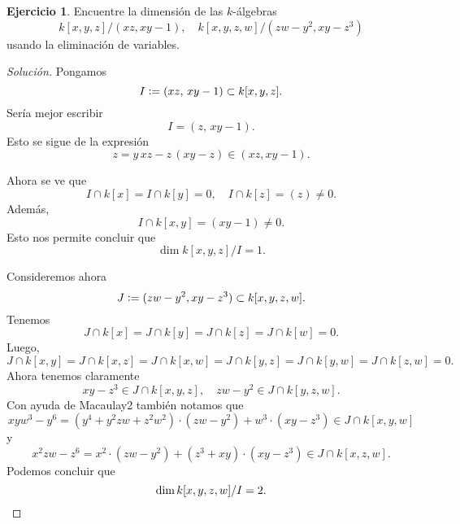\documentclass{article}
\theoremstyle{definition}
\newtheorem{ejerc}{Ejercicio}
\newenvironment{solucion}{\begin{proof}[Solución]}{\end{proof}}
\begin{document}
\begin{ejerc}
  Encuentre la dimensión de las $k$-álgebras
  $$k[x,y,z]/(xz, xy - 1), \quad k[x,y,z,w]/(zw - y^2 , xy - z^3)$$
  usando la eliminación de variables.

  \ifdefined\solutions\begin{solucion}
    Pongamos
    $$I \mathrel{\mathop:}= (xz, \, xy-1) \subset k[x,y,z].$$
    Sería mejor escribir
    $$I = (z, \, xy - 1).$$
    Esto se sigue de la expresión
    $$z = y\,xz - z\,(xy-z) \in (xz, xy - 1).$$

    Ahora se ve que
    $$I \cap k[x] = I \cap k[y] = 0, \quad I \cap k[z] = (z) \ne 0.$$
    Además,
    $$I \cap k[x,y] = (xy-1) \ne 0.$$
    Esto nos permite concluir que
    $$\dim k[x,y,z]/I = 1.$$

    Consideremos ahora
    $$J \mathrel{\mathop:}= (zw - y^2 , xy - z^3) \subset k [x,y,z,w].$$
    Tenemos
    $$J \cap k [x] = J \cap k [y] = J \cap k [z] = J \cap k [w] = 0.$$
    Luego,
    \[ J \cap k [x,y] =
       J \cap k [x,z] =
       J \cap k [x,w] =
       J \cap k [y,z] =
       J \cap k [y,w] =
       J \cap k [z,w] = 0. \]
    Ahora tenemos claramente
    $$xy - z^3 \in J \cap k[x,y,z], \quad zw - y^2 \in J \cap k[y,z,w].$$
    Con ayuda de Macaulay2 también notamos que
    \[ xyw^3 - y^6 =
       (y^4 + y^2 z w + z^2 w^2)\cdot (zw - y^2) + w^3\cdot (xy-z^3)
       \in J \cap k [x,y,w] \]
    y
    \[ x^2 z w - z^6 =
       x^2 \cdot (zw - y^2) + (z^3+xy)\cdot(xy - z^3)
       \in J \cap k [x,z,w]. \]
    Podemos concluir que
    \[ \dim k [x,y,z,w]/I = 2. \qedhere \]
  \end{solucion}\fi
\end{ejerc}
\end{document}
